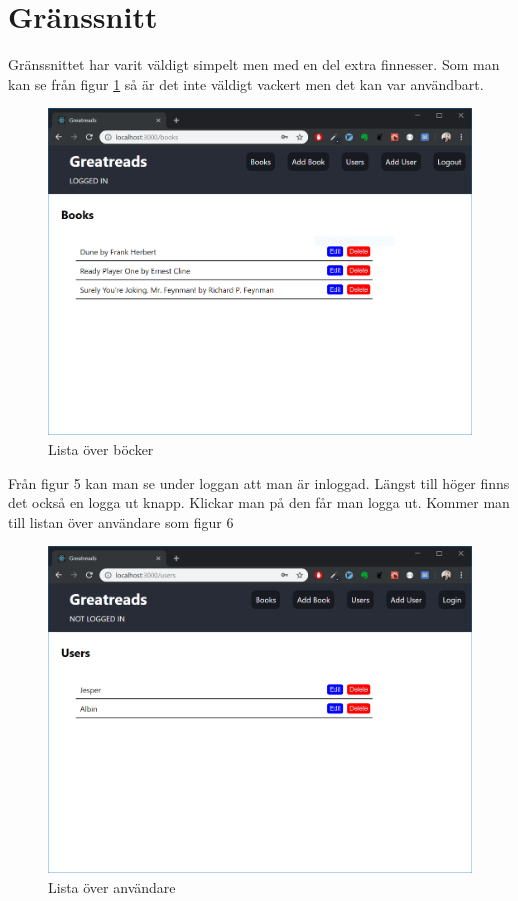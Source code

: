 \documentclass{article}
\begin{document}
\section{Gränssnitt}%
\label{sec:gr_nssnitt}
Gränssnittet har varit väldigt simpelt men med en del extra finnesser.
Som man kan se från figur \ref{fig:books} så är det inte väldigt vackert men det kan var användbart. 
\begin{figure}[H]
	\centering
	\includegraphics[width=0.8\linewidth]{Images/books.PNG}
	\caption{Lista över böcker}
	\label{fig:books}
\end{figure}
\noindent
Från figur 5 kan man se under loggan att man är inloggad.
Längst till höger finns det också en logga ut knapp. 
Klickar man på den får man logga ut.
Kommer man till listan över användare som figur 6
\begin{figure}[H]
	\centering
	\includegraphics[width=0.8\linewidth]{Images/users.PNG}
	\caption{Lista över användare}
	\label{fig:users}
\end{figure}
\end{document}
